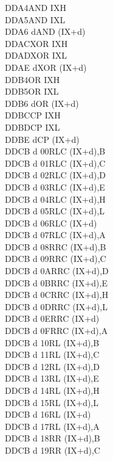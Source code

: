 \documentclass[12pt,twoside,openright,a4paper]{book}
\begin{document}
\begin{multicols}{3}
{\begin{tabbing}
	DDA4\>AND IXH\UNDOC\\
	DDA5\>AND IXL\UNDOC\\
	DDA6 d\>AND (IX+d)\\
	DDAC\>XOR IXH\UNDOC\\
	DDAD\>XOR IXL\UNDOC\\
	DDAE d\>XOR (IX+d)\\
	DDB4\>OR IXH\UNDOC\\
	DDB5\>OR IXL\UNDOC\\
	DDB6 d\>OR (IX+d)\\
	DDBC\>CP IXH\UNDOC\\
	DDBD\>CP IXL\UNDOC\\
	DDBE d\>CP (IX+d)\\
	DDCB d 00\>RLC (IX+d),B\UNDOC\\
	DDCB d 01\>RLC (IX+d),C\UNDOC\\
	DDCB d 02\>RLC (IX+d),D\UNDOC\\
	DDCB d 03\>RLC (IX+d),E\UNDOC\\
	DDCB d 04\>RLC (IX+d),H\UNDOC\\
	DDCB d 05\>RLC (IX+d),L\UNDOC\\
	DDCB d 06\>RLC (IX+d)\\
	DDCB d 07\>RLC (IX+d),A\UNDOC\\
	DDCB d 08\>RRC (IX+d),B\UNDOC\\
	DDCB d 09\>RRC (IX+d),C\UNDOC\\
	DDCB d 0A\>RRC (IX+d),D\UNDOC\\
	DDCB d 0B\>RRC (IX+d),E\UNDOC\\
	DDCB d 0C\>RRC (IX+d),H\UNDOC\\
	DDCB d 0D\>RRC (IX+d),L\UNDOC\\
	DDCB d 0E\>RRC (IX+d)\\
	DDCB d 0F\>RRC (IX+d),A\UNDOC\\
	DDCB d 10\>RL (IX+d),B\UNDOC\\
	DDCB d 11\>RL (IX+d),C\UNDOC\\
	DDCB d 12\>RL (IX+d),D\UNDOC\\
	DDCB d 13\>RL (IX+d),E\UNDOC\\
	DDCB d 14\>RL (IX+d),H\UNDOC\\
	DDCB d 15\>RL (IX+d),L\UNDOC\\
	DDCB d 16\>RL (IX+d)\\
	DDCB d 17\>RL (IX+d),A\UNDOC\\
	DDCB d 18\>RR (IX+d),B\UNDOC\\
	DDCB d 19\>RR (IX+d),C\UNDOC\\

\end{tabbing}}
\end{multicols}
\end{document}
